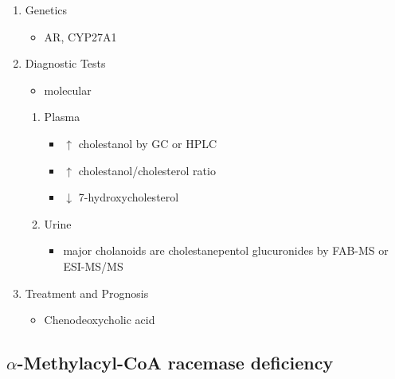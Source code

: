 \documentclass{scrartcl}
\begin{document}
\begin{enumerate}
\item Genetics
\label{sec:org4cbd674}
\begin{itemize}
\item AR, CYP27A1
\end{itemize}

\item Diagnostic Tests
\label{sec:org014cd17}
\begin{itemize}
\item molecular
\end{itemize}
\begin{enumerate}
\item Plasma
\label{sec:orgb911f3e}
\begin{itemize}
\item \(\uparrow\) cholestanol by GC or HPLC
\item \(\uparrow\) cholestanol/cholesterol ratio
\item \(\downarrow\) 7-hydroxycholesterol
\end{itemize}
\item Urine
\label{sec:org952af9a}
\begin{itemize}
\item major cholanoids are cholestanepentol glucuronides by FAB-MS or ESI-MS/MS
\end{itemize}
\end{enumerate}

\item Treatment and Prognosis
\label{sec:org5b231c4}
\begin{itemize}
\item Chenodeoxycholic acid
\end{itemize}
\end{enumerate}
\subsection{\(\alpha\)-Methylacyl-CoA racemase deficiency}
\label{sec:org6a8d0ea}
\end{document}
